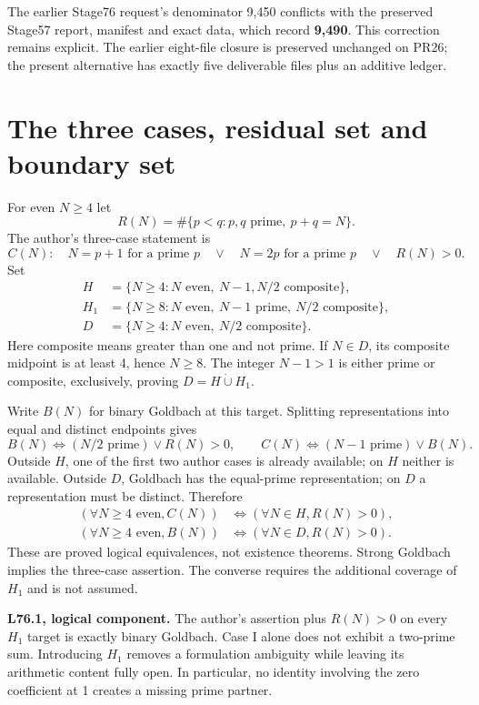 \documentclass[11pt,a4paper]{article}
\begin{document}
The earlier Stage76 request's denominator 9,450 conflicts with the preserved Stage57 report, manifest and exact data, which record \textbf{9,490}. This correction remains explicit. The earlier eight-file closure is preserved unchanged on PR26; the present alternative has exactly five deliverable files plus an additive ledger.
\newpage
\section{The three cases, residual set and boundary set}
For even $N\ge4$ let
\[
 R(N)=\#\{p<q:p,q\text{ prime},\ p+q=N\}.
\]
The author's three-case statement is
\[
 C(N):\quad N=p+1\text{ for a prime }p\quad\lor\quad
 N=2p\text{ for a prime }p\quad\lor\quad R(N)>0.
\]
Set
\begin{align*}
H&=\{N\ge4:N\text{ even},\ N-1,N/2\text{ composite}\},\\
H_1&=\{N\ge8:N\text{ even},\ N-1\text{ prime},\ N/2\text{ composite}\},\\
D&=\{N\ge4:N\text{ even},\ N/2\text{ composite}\}.
\end{align*}
Here composite means greater than one and not prime. If $N\in D$, its composite midpoint is at least 4, hence $N\ge8$. The integer $N-1>1$ is either prime or composite, exclusively, proving $D=H\mathbin{\dot\cup}H_1$.

Write $B(N)$ for binary Goldbach at this target. Splitting representations into equal and distinct endpoints gives
\[
 B(N)\iff (N/2\text{ prime})\lor R(N)>0,
 \qquad C(N)\iff(N-1\text{ prime})\lor B(N).
\]
Outside $H$, one of the first two author cases is already available; on $H$ neither is available. Outside $D$, Goldbach has the equal-prime representation; on $D$ a representation must be distinct. Therefore
\begin{align*}
(\forall N\ge4\text{ even},C(N))&\iff(\forall N\in H,R(N)>0),\\
(\forall N\ge4\text{ even},B(N))&\iff(\forall N\in D,R(N)>0).
\end{align*}
These are proved logical equivalences, not existence theorems. Strong Goldbach implies the three-case assertion. The converse requires the additional coverage of $H_1$ and is not assumed.

\textbf{L76.1, logical component.} The author's assertion plus $R(N)>0$ on every $H_1$ target is exactly binary Goldbach. Case I alone does not exhibit a two-prime sum. Introducing $H_1$ removes a formulation ambiguity while leaving its arithmetic content fully open. In particular, no identity involving the zero coefficient at 1 creates a missing prime partner.
\newpage
\end{document}

